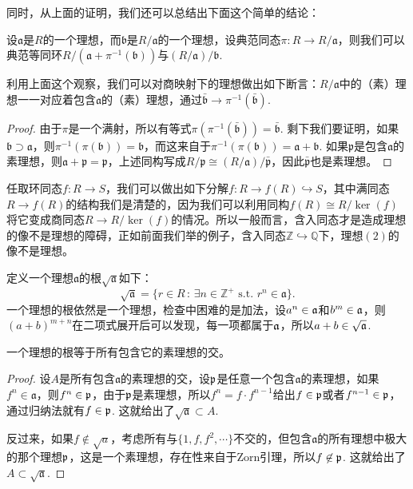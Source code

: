 同时，从上面的证明，我们还可以总结出下面这个简单的结论：
\begin{lem}
设$\mathfrak a$是$R$的一个理想，而$\mathfrak{b}$是$R/\mathfrak a$的一个理想，设典范同态$\pi:R\to R/\mathfrak a$，则我们可以典范等同环$R/(\mathfrak a+\pi^{-1}(\mathfrak b))$与$(R/\mathfrak a)/\mathfrak b$.
\end{lem}

利用上面这个观察，我们可以对商映射下的理想做出如下断言：$R/\mathfrak{a}$中的（素）理想一一对应着包含$\mathfrak{a}$的（素）理想，通过$\bar{\mathfrak{b}}\to \pi^{-1}(\bar{\mathfrak{b}})$.

\begin{proof} 
	由于$\pi$是一个满射，所以有等式$\pi(\pi^{-1}(\bar{\mathfrak{b}}))=\bar{\mathfrak{b}}$. 剩下我们要证明，如果$\mathfrak{b}\supset \mathfrak{a}$，则$\pi^{-1}(\pi(\mathfrak{b}))=\mathfrak{b}$，而这来自于$\pi^{-1}(\pi(\mathfrak{b}))=\mathfrak{a}+\mathfrak{b}$. 如果$\mathfrak{p}$是包含$\mathfrak{a}$的素理想，则$\mathfrak{a}+\mathfrak{p}=\mathfrak{p}$，上述同构写成$R/\mathfrak{p}\cong (R/\mathfrak{a})/\bar{\mathfrak{p}}$，因此$\bar{\mathfrak{p}}$也是素理想。
\end{proof}

任取环同态$f:R\to S$，我们可以做出如下分解$f:R\to f(R)\hookrightarrow S$，其中满同态$R\to f(R)$的结构我们是清楚的，因为我们可以利用同构$f(R)\cong R/\ker(f)$将它变成商同态$R\to R/\ker(f)$的情况。所以一般而言，含入同态才是造成理想的像不是理想的障碍，正如前面我们举的例子，含入同态$\mathbb{Z}\hookrightarrow \mathbb{Q}$下，理想$(2)$的像不是理想。

\begin{para}[理想的根]
定义一个理想$\mathfrak{a}$的根$\sqrt{\mathfrak{a}}$如下：
\[
	\sqrt{\mathfrak{a}}=\{r\in R\,:\,\exists n\in \mathbb{Z}^+\text{ s.t. }r^n\in \mathfrak{a}\}.
\]
一个理想的根依然是一个理想，检查中困难的是加法，设$a^n\in \mathfrak{a}$和$b^m\in \mathfrak{a}$，则$(a+b)^{m+n}$在二项式展开后可以发现，每一项都属于$\mathfrak{a}$，所以$a+b\in \sqrt{\mathfrak{a}}$.
\end{para}

\begin{pro}
一个理想的根等于所有包含它的素理想的交。
\end{pro}

\begin{proof}
设$A$是所有包含$\mathfrak{a}$的素理想的交，设$\mathfrak{p}$是任意一个包含$\mathfrak{a}$的素理想，如果$f^n\in \mathfrak{a}$，则$f^n\in \mathfrak{p}$，由于$\mathfrak{p}$是素理想，所以$f^n=f\cdot f^{n-1}$给出$f\in\mathfrak{p}$或者$f^{n-1}\in\mathfrak{p}$，通过归纳法就有$f\in \mathfrak{p}$. 这就给出了$\sqrt{\mathfrak{a}}\subset A$. 

反过来，如果$f\not\in \sqrt{a}$，考虑所有与$\{1,f,f^2,\cdots\}$不交的，但包含$\mathfrak{a}$的所有理想中极大的那个理想$\mathfrak{p}$，这是一个素理想，存在性来自于Zorn引理，所以$f\not\in \mathfrak{p}$. 这就给出了$A\subset \sqrt{\mathfrak{a}}$.
\end{proof}


